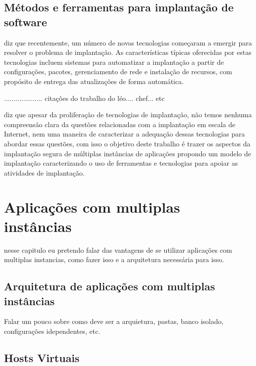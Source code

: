 \subsection{Métodos e ferramentas para implantação de software}


\cite{deployment1998} diz que recentemente, um número de novas tecnologias
começaram a emergir para resolver o problema de implantação. As características
típicas oferecidas por estas tecnologias incluem sistemas para automatizar a
implantação a partir de configurações, pacotes, gerenciamento de rede
e instalação de recursos, com  propósito de entrega das atualizações de forma
automática.


.................... citações do trabalho do léo.... chef... etc

\cite{deployment1998} diz que  apesar da proliferação de tecnologias de
implantação, não temos nenhuma compreensão clara da questões relacionadas com a
implantação em escala de Internet, nem uma maneira de caracterizar a adequação
dessas tecnologias para abordar essas questões, com isso o objetivo deste trabalho
é trazer os aspectos da implantação segura de múltiplas instâncias de aplicações
propondo um modelo de implantação caracterizando o uso de ferramentas e tecnologias
para apoiar as atividades de implantação.



\section{Aplicações com multiplas instâncias}
\label{cap-multiplas}

nesse capitulo eu pretendo falar das vantagens de se utilizar aplicações com
multiplas instancias, como fazer isso e a arquitetura necessária para isso.

\subsection{Arquitetura de aplicações com multiplas instâncias}

Falar um pouco sobre como deve ser a arquietura, pastas, banco isolado,
configurações idependentes, etc.

\subsection{Hosts Virtuais}

